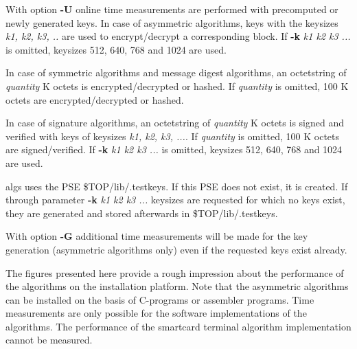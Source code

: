 With option {\bf -U} online time measurements are performed with precomputed or newly generated keys. 
In case of asymmetric algorithms, keys with the keysizes {\em k1, k2, k3, ..} are used to 
encrypt/decrypt a corresponding block. If {\bf -k} {\em k1 k2 k3 ...} is omitted, keysizes
512, 640, 768 and 1024 are used.

In case of symmetric algorithms and message digest algorithms, an octetstring of {\em quantity} K
octets is encrypted/decrypted or hashed. If {\em quantity} is omitted, 100 K octets are
encrypted/decrypted or hashed.

In case of signature algorithms, an octetstring of {\em quantity} K octets is signed
and verified with keys of keysizes {\em k1, k2, k3, ...}. If {\em quantity} is omitted, 100 K octets are 
signed/verified. If {\bf -k} {\em k1 k2 k3 ...} is omitted, keysizes 512, 640, 768 and 1024 are used.

algs uses the PSE \$TOP/lib/.testkeys. If this PSE does not exist, it is created. If through
parameter {\bf -k} {\em k1 k2 k3 ...} keysizes are requested for which no keys exist,
they are generated and stored afterwards in \$TOP/lib/.testkeys.

With option {\bf -G} additional time measurements will be made for the key generation (asymmetric 
algorithms only) even if the requested keys exist already.

The figures presented here provide a rough impression about the performance of the algorithms on the 
installation platform. Note that the asymmetric algorithms can be installed on the
basis of C-programs or assembler programs. Time measurements are only possible for the software 
implementations of the algorithms. The performance of the smartcard terminal algorithm
implementation cannot be measured.

